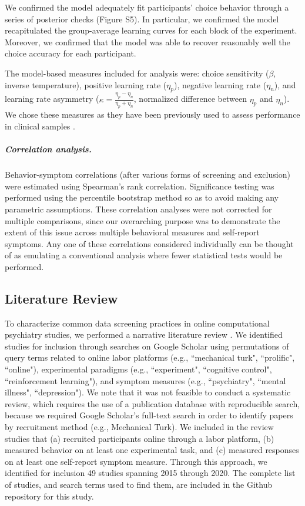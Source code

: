 \documentclass[a4paper,notitlepage,12pt]{article}
\begin{document}
We confirmed the model adequately fit participants' choice behavior through a series of posterior checks (Figure S5). In particular, we confirmed the model recapitulated the group-average learning curves for each block of the experiment. Moreover, we confirmed that the model was able to recover reasonably well the choice accuracy for each participant.

The model-based measures included for analysis were: choice sensitivity ($\beta$,  inverse temperature), positive learning rate ($\eta_p$), negative learning rate ($\eta_n$), and learning rate asymmetry ($\kappa = \frac{\eta_p-\eta_n}{\eta_p+\eta_n}$, normalized difference between $\eta_p$ and $\eta_n$). We chose these measures as they have been previously used to assess performance in clinical samples \cite{huang2017computational, brolsma2020challenging, mukherjee_reward_2020, ritschel2017neural}. 

\subparagraph{Correlation analysis.} Behavior-symptom correlations (after various forms of screening and exclusion) were estimated using Spearman's rank correlation. Significance testing was performed using the percentile bootstrap method \cite{wilcox2018guide} so as to avoid making any parametric assumptions. These correlation analyses were not corrected for multiple comparisons, since our overarching purpose was to demonstrate the extent of this issue across multiple behavioral measures and self-report symptoms. Any one of these correlations considered individually can be thought of as emulating a conventional analysis where fewer statistical tests would be performed.

\subsection*{Literature Review}

To characterize common data screening practices in online computational psychiatry studies, we performed a narrative literature review \cite{grant2009typology}. We identified studies for inclusion through searches on Google Scholar using permutations of query terms related to online labor platforms (e.g., ``mechanical turk", ``prolific", ``online"), experimental paradigms (e.g., ``experiment", ``cognitive control", ``reinforcement learning"), and symptom measures (e.g., ``psychiatry", ``mental illness", ``depression"). We note that it was not feasible to conduct a systematic review, which requires the use of a publication database with reproducible search, because we required Google Scholar's full-text search in order to identify papers by recruitment method (e.g., Mechanical Turk). We included in the review studies that (a) recruited participants online through a labor platform, (b) measured behavior on at least one experimental task, and (c) measured responses on at least one self-report symptom measure. Through this approach, we identified for inclusion 49 studies spanning 2015 through 2020. The complete list of studies, and search terms used to find them, are included in the Github repository for this study.
\end{document}
